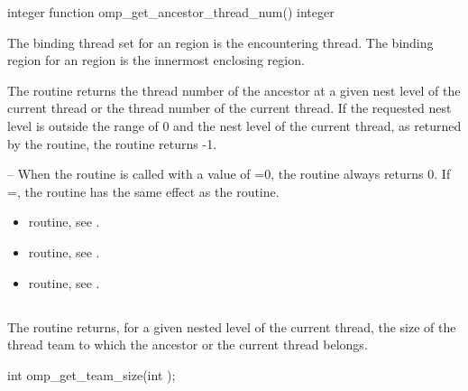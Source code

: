 \fortranspecificstart
\begin{boxedcode}
integer function omp\_get\_ancestor\_thread\_num()
integer 
\end{boxedcode}
\fortranspecificend

\binding
The binding thread set for an  region is the 
encountering thread. The binding region for an  
region is the innermost enclosing  region. 

\effect
The  routine returns the thread number of the 
ancestor at a given nest level of the current thread or the thread number of the current 
thread. If the requested nest level is outside the range of 0 and the nest level of the 
current thread, as returned by the  routine, the routine returns -1.

\notestart
\noteheader – When the  routine is called with a value 
of =0, the routine always returns 0. If =, the routine 
has the same effect as the  routine. 
\noteend

\crossreferences
\begin{itemize}
\item {} routine, see 
.

\item {} routine, see 
.

\item {} routine, see 
.
\end{itemize}










\subsection{}
\label{subsec:omp_get_team_size}
\summary
The  routine returns, for a given nested level of the current 
thread, the size of the thread team to which the ancestor or the current thread belongs. 

\format
\ccppspecificstart
\begin{boxedcode}
int omp\_get\_team\_size(int );
\end{boxedcode}
\ccppspecificend

